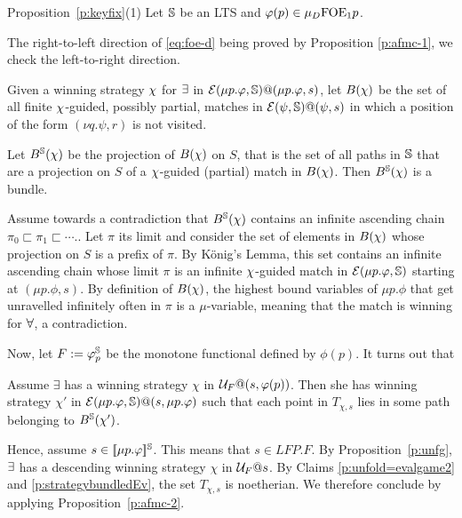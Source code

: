 \begin{proofof}{Proposition~\ref{p:keyfix}(1)}
%    
Let $\mathbb{S}$ be an LTS and $\varphi(p) \in \mu_{D}\mathrm{FOE}_1{p}$. 

The right-to-left direction of \eqref{eq:foe-d} being proved by Proposition \ref{p:afmc-1}, we check the left-to-right direction.

Given  a winning strategy   $\chi$ for $\exists$ in $\mathcal{E}(\mu p. \varphi,\mathbb{S})@(\mu p. \varphi,s)$, 
let $B(\chi)$ be the set of all finite $\chi$-guided, possibly partial, matches in  $\mathcal{E}(\psi,\mathbb{S})@(\psi,s)$ in which a position of the form $(\nu q. \psi, r)$ is not visited.

\begin{claim}\label{p:strategybundledEv}
Let $B^{\mathbb{S}}(\chi)$ be the projection of $B(\chi)$ on $S$, that is the set of all paths in $\mathbb{S}$ that are a projection on $S$ of a $\chi$-guided (partial) match in $B(\chi)$. Then $B^{\mathbb{S}}(\chi)$ is a bundle.
\end{claim}
\begin{pfclaim}
Assume towards a contradiction that $B^{\mathbb{S}}(\chi)$ contains an  infinite ascending chain $\pi_{0} \sqsubset \pi_{1} \sqsubset 
\cdots.$. Let $\pi$ its limit and consider the set of elements in $B(\chi)$ whose projection on $S$ is a prefix of $\pi$. 
By  K\"{o}nig's Lemma, this set contains an infinite ascending chain whose limit $\pi$ is an infinite $\chi$-guided match  in $\mathcal{E}(\mu p. \varphi,\mathbb{S})$ starting at $(\mu p. \phi,s)$. By definition of $B(\chi)$,  the highest bound variables of $\mu p. \phi$ that get unravelled infinitely often
in $\pi$ is a $\mu$-variable, meaning that the match is winning for $\forall$, a contradiction.
\end{pfclaim}
%
\noindent

Now, let $F := \varphi_{p}^{\mathbb{S}}$ be the monotone functional defined by $\phi(p)$. It turns out that

\begin{claim}\label{p:unfold=evalgame2}
Assume $\exists$ has a winning strategy $\chi$ in $\mathcal{U}_F@(s,\varphi(p))$. Then she has winning strategy $\chi'$ in 
$\mathcal{E}(\mu p.\varphi,\mathbb{S})@(s, \mu p.\varphi)$ such that each point in $T_{\chi,s}$ lies in some path belonging to $B^{\mathbb{S}}(\chi')$.
\end{claim}

Hence, assume $s \in [\![ \mu p.\varphi ]\!]^{\mathbb{S}}$. This means that $s \in  LFP. F$. By Proposition~\ref{p:unfg},  $\exists$ has a descending winning strategy $\chi$ in 
$\mathcal{U}_{F}@s$. By Claims \ref{p:unfold=evalgame2} and \ref{p:strategybundledEv}, the set $T_{\chi, s}$ is noetherian.   We therefore conclude by applying  Proposition~\ref{p:afmc-2}.
\end{proofof}
